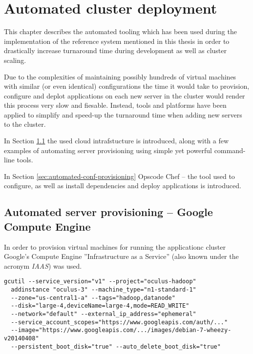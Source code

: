 \chapter{Automated cluster deployment}
\label{app:chef}
This chapter describes the automated tooling which has been used during the implementation of the reference system mentioned in this thesis in order to drastically increase turnaround time during development as well as cluster scaling.

Due to the complexities of maintaining possibly hundreds of virtual machines with similar (or even identical) configurations the time it would take to provision, configure and deplot applications on each new server in the cluster would render this process very slow and fiesable. Instead, tools and platforms have been applied to simplify and speed-up the turnaround time when adding new servers to the cluster. 

In Section \ref{sec:automated-server-provisioning} the used cloud intrafstucture is introduced, along with a few examples of automating server provisioning using simple yet powerful command-line tools. 

In Section \ref{sec:automated-conf-provisioning} Opscode Chef -- the tool used to configure, as well as install dependencies and deploy applications is introduced.

\section{Automated server provisioning -- Google Compute Engine}
\label{sec:automated-server-provisioning}

In order to provision virtual machines for running the applicationc cluster Google's Compute Engine ''Infrastructure as a Service'' (also known under the acronym \textit{IAAS}) was used. 


\begin{lstlisting}[caption={Creating new instance on GCE}, label={lst:new-gce-instance-bash}]
gcutil --service_version="v1" --project="oculus-hadoop" 
  addinstance "oculus-3" --machine_type="n1-standard-1" 
  --zone="us-central1-a" --tags="hadoop,datanode"
  --disk="large-4,deviceName=large-4,mode=READ_WRITE"
  --network="default" --external_ip_address="ephemeral" 
  --service_account_scopes="https://www.googleapis.com/auth/..." 
  --image="https://www.googleapis.com/.../images/debian-7-wheezy-v20140408" 
  --persistent_boot_disk="true" --auto_delete_boot_disk="true"
\end{lstlisting}



